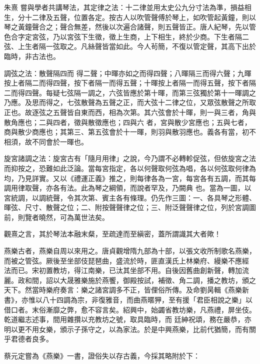 \begin{pinyinscope}
 朱熹
 嘗與學者共講琴法，其定律之法：十二律並用太史公九分寸法為準，損益相生，分十二律及五聲，位置各定。按古人以吹管聲傅於琴上，如吹管起黃鐘，則以琴之黃鐘聲合之；聲合無差，然後以次遍合諸聲，則五聲皆正。唐人紀琴，先以管色合字定宮弦，乃以宮弦下生徵，徵上生商，上下相生，終於少商。下生者隔二弦、上生者隔一弦取之。凡絲聲皆當如此。今人茍簡，不復以管定聲，其高下出於臨時，非古法也。



 調弦之法：散聲隔四而
 得二聲；中暉亦如之而得四聲；八暉隔三而得六聲；九暉按上者隔二而得四聲，按下者隔一而得五聲；十暉按上者隔一而得五聲，按下者隔二而得四聲。每疑七弦隔一調之，六弦皆應於第十暉，而第三弦獨於第十一暉調之乃應。及思而得之，七弦散聲為五聲之正，而大弦十二律之位，又眾弦散聲之所取正也。故逐弦之五聲皆自東而西，相為次第。其六弦會於十暉，則一與三者，角與散角應也；二與四者，徵與散徵應也；四與六
 者，宮與散少宮應也；五與七者，商與散少商應也；其第三、第五弦會於十一暉，則羽與散羽應也。義各有當，初不相須，故不同會於一暉也。



 旋宮諸調之法：旋宮古有「隨月用律」之說，今乃謂不必轉軫促弦，但依旋宮之法而抑按之，恐難如此泛論。當每宮指定，各以何聲取何弦為唱，各以何弦取何律為均，乃見詳實。又以《禮運正義》推之，則每律各為一宮，每宮各有五調，而其每調用律取聲，亦各有法。此為琴之綱領，而說者罕及，乃闕典
 也。當為一圖，以宮統調，以調統聲，令其次第、賓主各有條理。仍先作三圖：一、各具琴之形體、暉弦、尺寸、散聲之位；二、附按聲聲律之位；三、附泛聲聲律之位，列於宮調圖前，則覽者曉然，可為萬世法矣。



 觀熹之言，其於琴法本融末粲，至疏達而至縝密，蓋所謂識其大者歟！



 燕樂古者，燕樂自周以來用之。唐貞觀增隋九部為十部，以張文收所制歌名燕樂，而被之管弦。厥後至坐部伎琵琶曲，盛流於時，匪直漢氏上林樂府、縵樂不應經
 法而已。宋初置教坊，得江南樂，已汰其坐部不用。自後因舊曲創新聲，轉加流麗。政和間，詔以大晟雅樂施於燕饗，御殿按試，補徵、角二調，播之教坊，頒之天下。然當時樂府奏言：樂之諸宮調多不正，皆俚俗所傳。及命劉昺輯《燕樂新書》，亦惟以八十四調為宗，非復雅音，而曲燕暱狎，至有援「君臣相說之樂」以借口者。末俗漸靡之弊，愈不容言矣。紹興中，始蠲省教坊樂，凡燕禮，屏坐伎。乾道繼志述事，間用雜攢以充教坊之號，取具臨時，而
 廷紳祝頌，務在嚴恭，亦明以更不用女樂，頒示子孫守之，以為家法。於是中興燕樂，比前代猶簡，而有關乎君德者良多。



 蔡元定嘗為《燕樂》一書，證俗失以存古義，今採其略附於下：




\end{pinyinscope}
